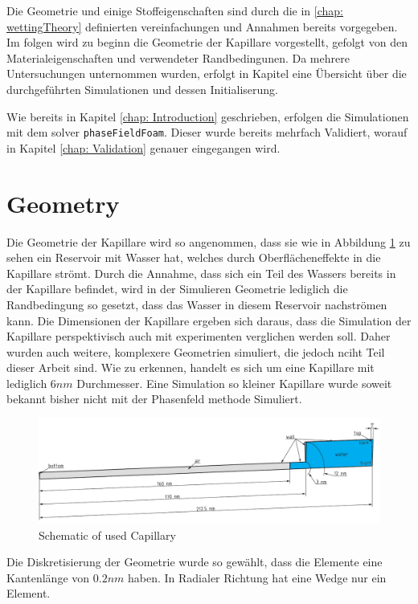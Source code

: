 Die Geometrie und einige Stoffeigenschaften sind durch die in \ref{chap: wettingTheory} definierten vereinfachungen und Annahmen bereits vorgegeben. Im folgen wird zu beginn die Geometrie der Kapillare vorgestellt, gefolgt von den Materialeigenschaften und verwendeter Randbedingunen. Da mehrere Untersuchungen unternommen wurden, erfolgt in Kapitel eine Übersicht über die durchgeführten Simulationen und dessen Initialiserung. 


Wie bereits in Kapitel \ref{chap: Introduction} geschrieben, erfolgen die Simulationen mit dem solver \texttt{phaseFieldFoam}. Dieser wurde bereits mehrfach Validiert, worauf in Kapitel \ref{chap: Validation} genauer eingegangen wird.
\section{Geometry}
Die Geometrie der Kapillare wird so angenommen, dass sie wie in Abbildung \ref{fig: Capillary Geometry} zu sehen ein Reservoir mit Wasser hat, welches durch Oberflächeneffekte in die Kapillare strömt. Durch die Annahme, dass sich ein Teil des Wassers bereits in der Kapillare befindet, wird in der Simulieren Geometrie lediglich die Randbedingung so gesetzt, dass das Wasser in diesem Reservoir nachströmen kann. Die Dimensionen der Kapillare ergeben sich daraus, dass die Simulation der Kapillare perspektivisch auch mit experimenten verglichen werden soll. Daher wurden auch weitere, komplexere Geometrien simuliert, die jedoch nciht Teil dieser Arbeit sind. 
Wie zu erkennen, handelt es sich um eine Kapillare mit lediglich $6nm$ Durchmesser. Eine Simulation so kleiner Kapillare wurde soweit bekannt bisher nicht mit der Phasenfeld methode Simuliert.

\begin{figure}[h]
    \centering
    \includegraphics[width=.95\textwidth]{Pictures/Cap_5DEG.pdf}
    \caption{Schematic of used Capillary}
    \label{fig: Capillary Geometry}
\end{figure}

Die Diskretisierung der Geometrie wurde so gewählt, dass die Elemente eine Kantenlänge von $0.2nm$ haben. In Radialer Richtung hat eine Wedge nur ein Element. 

